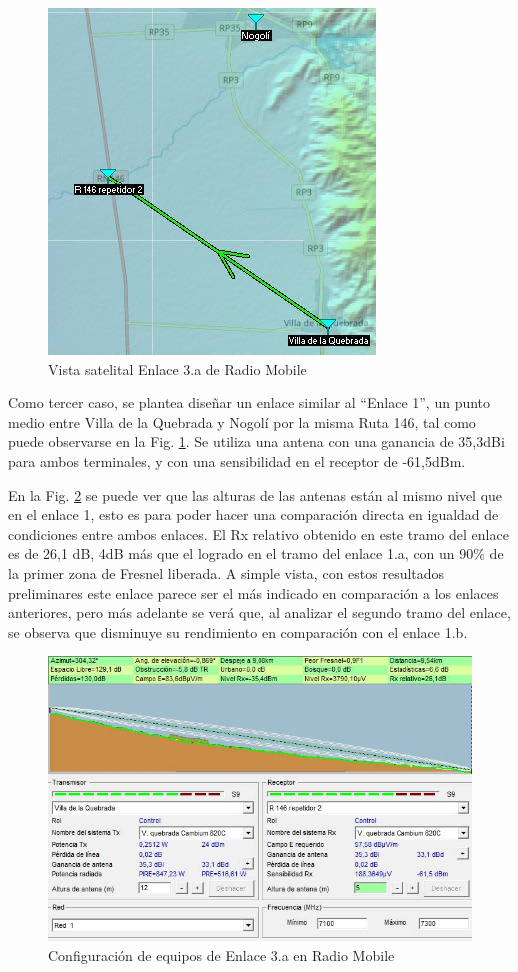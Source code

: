 \documentclass[12pt,a4paper]{book}
\begin{document}
\begin{figure} [H]
\centering
\includegraphics[width= 8 cm]{../figuras/red_transporte_9.jpg}
\caption{Vista satelital Enlace 3.a de Radio Mobile}
\label{fig_red_transporte_9}
\end{figure}

Como tercer caso, se plantea diseñar un enlace similar al “Enlace 1”, un punto medio entre Villa de la Quebrada y Nogolí por la misma Ruta 146, tal como puede observarse en la Fig. \ref{fig_red_transporte_9}.
Se utiliza una antena con una ganancia de 35,3dBi para ambos terminales, y con una sensibilidad en el receptor de -61,5dBm.

En la Fig. \ref{fig_red_transporte_10} se puede ver que las alturas de las antenas están al mismo nivel que en el enlace 1, esto es para poder hacer una comparación directa en igualdad de condiciones entre ambos enlaces. El Rx relativo obtenido en este tramo del enlace es de 26,1 dB, 4dB más que el logrado en el tramo del enlace 1.a, con un 90\% de la primer zona de Fresnel liberada. A simple vista, con estos resultados preliminares este enlace parece ser el más indicado en comparación a los enlaces anteriores, pero más adelante se verá que, al analizar el segundo tramo del enlace, se observa que disminuye su rendimiento en comparación con el enlace 1.b.

\begin{figure} [H]
\centering
\includegraphics[width= 12 cm]{../figuras/red_transporte_10.jpg}
\caption{Configuración de equipos de Enlace 3.a en Radio Mobile}
\label{fig_red_transporte_10}
\end{figure}
\end{document}
